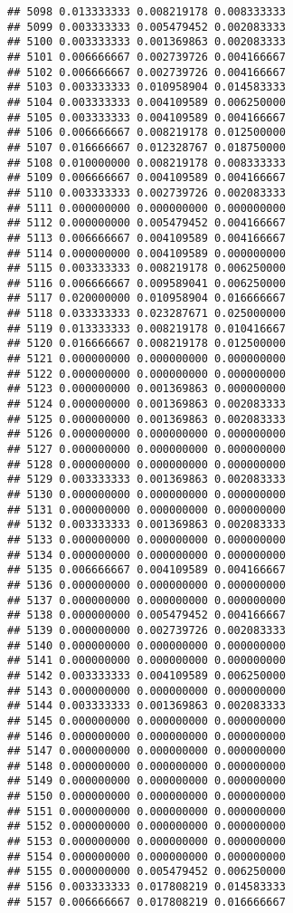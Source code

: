 \documentclass[
]{article}
\begin{document}
\begin{verbatim}
## 5098 0.013333333 0.008219178 0.008333333
## 5099 0.003333333 0.005479452 0.002083333
## 5100 0.003333333 0.001369863 0.002083333
## 5101 0.006666667 0.002739726 0.004166667
## 5102 0.006666667 0.002739726 0.004166667
## 5103 0.003333333 0.010958904 0.014583333
## 5104 0.003333333 0.004109589 0.006250000
## 5105 0.003333333 0.004109589 0.004166667
## 5106 0.006666667 0.008219178 0.012500000
## 5107 0.016666667 0.012328767 0.018750000
## 5108 0.010000000 0.008219178 0.008333333
## 5109 0.006666667 0.004109589 0.004166667
## 5110 0.003333333 0.002739726 0.002083333
## 5111 0.000000000 0.000000000 0.000000000
## 5112 0.000000000 0.005479452 0.004166667
## 5113 0.006666667 0.004109589 0.004166667
## 5114 0.000000000 0.004109589 0.000000000
## 5115 0.003333333 0.008219178 0.006250000
## 5116 0.006666667 0.009589041 0.006250000
## 5117 0.020000000 0.010958904 0.016666667
## 5118 0.033333333 0.023287671 0.025000000
## 5119 0.013333333 0.008219178 0.010416667
## 5120 0.016666667 0.008219178 0.012500000
## 5121 0.000000000 0.000000000 0.000000000
## 5122 0.000000000 0.000000000 0.000000000
## 5123 0.000000000 0.001369863 0.000000000
## 5124 0.000000000 0.001369863 0.002083333
## 5125 0.000000000 0.001369863 0.002083333
## 5126 0.000000000 0.000000000 0.000000000
## 5127 0.000000000 0.000000000 0.000000000
## 5128 0.000000000 0.000000000 0.000000000
## 5129 0.003333333 0.001369863 0.002083333
## 5130 0.000000000 0.000000000 0.000000000
## 5131 0.000000000 0.000000000 0.000000000
## 5132 0.003333333 0.001369863 0.002083333
## 5133 0.000000000 0.000000000 0.000000000
## 5134 0.000000000 0.000000000 0.000000000
## 5135 0.006666667 0.004109589 0.004166667
## 5136 0.000000000 0.000000000 0.000000000
## 5137 0.000000000 0.000000000 0.000000000
## 5138 0.000000000 0.005479452 0.004166667
## 5139 0.000000000 0.002739726 0.002083333
## 5140 0.000000000 0.000000000 0.000000000
## 5141 0.000000000 0.000000000 0.000000000
## 5142 0.003333333 0.004109589 0.006250000
## 5143 0.000000000 0.000000000 0.000000000
## 5144 0.003333333 0.001369863 0.002083333
## 5145 0.000000000 0.000000000 0.000000000
## 5146 0.000000000 0.000000000 0.000000000
## 5147 0.000000000 0.000000000 0.000000000
## 5148 0.000000000 0.000000000 0.000000000
## 5149 0.000000000 0.000000000 0.000000000
## 5150 0.000000000 0.000000000 0.000000000
## 5151 0.000000000 0.000000000 0.000000000
## 5152 0.000000000 0.000000000 0.000000000
## 5153 0.000000000 0.000000000 0.000000000
## 5154 0.000000000 0.000000000 0.000000000
## 5155 0.000000000 0.005479452 0.006250000
## 5156 0.003333333 0.017808219 0.014583333
## 5157 0.006666667 0.017808219 0.016666667

\end{verbatim}
\end{document}
